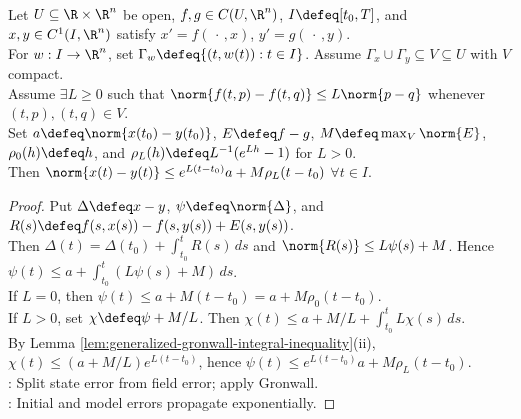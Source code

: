 \begin{theorem} \label{thm:continuous-dependence-ode-data} \\
Let $U\subseteq\R\times\R^n$ be open, $f,g\in C(U,\R^n)$, $I\defeq[t_0,T]$, and $x,y\in C^1(I,\R^n)$ satisfy $x'=f(\,\cdot\,,x)$, $y'=g(\,\cdot\,,y)$.\\
For $w:I\to\R^n$, set $\Gamma_w\defeq\{(t,w(t)):t\in I\}$. Assume $\Gamma_x\cup\Gamma_y\subseteq V\subseteq U$ with $V$ compact.\\
Assume $\exists L\geq0$ such that $\norm{f(t,p)-f(t,q)}\leq L\norm{p-q}$ whenever $(t,p),(t,q)\in V$.\\
Set $a\defeq\norm{x(t_0)-y(t_0)}$, $E\defeq f-g$, $M\defeq\max_V\norm{E}$, $\rho_0(h)\defeq h$, and $\rho_L(h)\defeq L^{-1}(e^{Lh}-1)$ for $L>0$.\\
Then $\norm{x(t)-y(t)}\leq e^{L(t-t_0)}a+M\rho_L(t-t_0)$ $\forall t\in I$.
\begin{proof}
Put $\Delta\defeq x-y$, $\psi\defeq\norm{\Delta}$, and $R(s)\defeq f(s,x(s))-f(s,y(s))+E(s,y(s))$.\\
Then $\Delta(t)=\Delta(t_0)+\int_{t_0}^tR(s)\,ds$ and $\norm{R(s)}\leq L\psi(s)+M$. Hence $\psi(t)\leq a+\int_{t_0}^t(L\psi(s)+M)\,ds$.\\
If $L=0$, then $\psi(t)\leq a+M(t-t_0)=a+M\rho_0(t-t_0)$.\\
If $L>0$, set $\chi\defeq\psi+M/L$. Then $\chi(t)\leq a+M/L+\int_{t_0}^tL\chi(s)\,ds$.\\
By Lemma \ref{lem:generalized-gronwall-integral-inequality}(ii), $\chi(t)\leq(a+M/L)e^{L(t-t_0)}$, hence $\psi(t)\leq e^{L(t-t_0)}a+M\rho_L(t-t_0)$.\\
: Split state error from field error; apply Gronwall.\\
: Initial and model errors propagate exponentially.
\end{proof}
\end{theorem}

